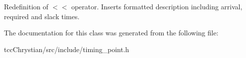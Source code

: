 Redefinition of $<$$<$ operator. Inserts formatted description including arrival, required and slack times. 



The documentation for this class was generated from the following file\-:\begin{DoxyCompactItemize}
\item 
tcc\-Chrystian/src/include/timing\-\_\-point.\-h\end{DoxyCompactItemize}

